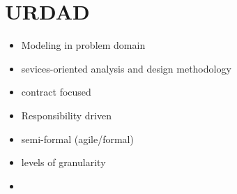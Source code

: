 \section{URDAD}

\begin{itemize}
  \item Modeling in problem domain
  \item sevices-oriented analysis and design methodology
  \item contract focused
  \item Responsibility driven
  \item semi-formal (agile/formal)
  \item levels of granularity
  \item
\end{itemize}
